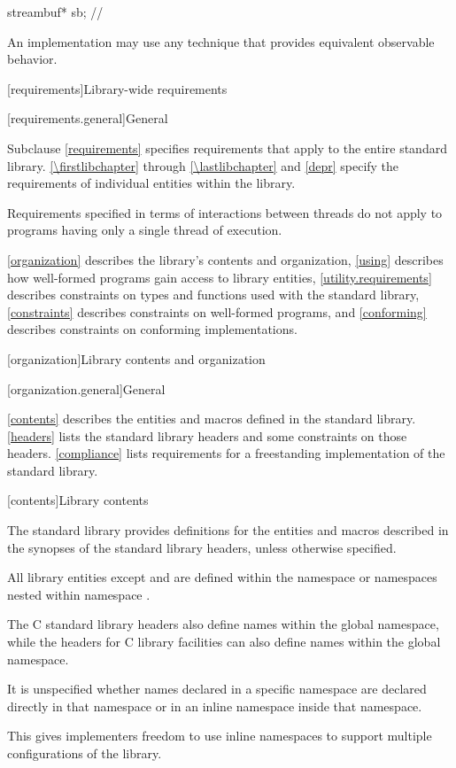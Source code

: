 \begin{codeblock}
streambuf* sb;      // \expos
\end{codeblock}

\pnum
An implementation may use any technique that provides equivalent observable behavior.

[requirements]{Library-wide requirements}

[requirements.general]{General}

\pnum
Subclause \ref{requirements} specifies requirements that apply to the entire \Cpp{} standard library.
\ref{\firstlibchapter} through \ref{\lastlibchapter} and \ref{depr}
specify the requirements of individual entities within the library.

\pnum
Requirements specified in terms of interactions between threads do not apply to
programs having only a single thread of execution.

\pnum
\ref{organization} describes the library's contents and
organization, \ref{using} describes how well-formed \Cpp{} programs gain access to library
entities,
\ref{utility.requirements} describes constraints on types and functions used with
the \Cpp{} standard library,
\ref{constraints} describes constraints on well-formed \Cpp{} programs, and
\ref{conforming} describes constraints on conforming implementations.

[organization]{Library contents and organization}

[organization.general]{General}

\pnum
\ref{contents} describes the entities and macros defined in the \Cpp{} standard library.
\ref{headers} lists the standard library headers and some constraints on those headers.
\ref{compliance} lists requirements for a freestanding implementation of the \Cpp{}
standard library.

[contents]{Library contents}

\pnum
The \Cpp{} standard library provides definitions
for the entities and macros described in the synopses
of the \Cpp{} standard library headers,
unless otherwise specified.

\pnum
All library entities except
and
are defined within the namespace
or namespaces nested within namespace
.
\begin{footnote}
The C standard library headers also define
names within the global namespace, while the \Cpp{} headers for C library
facilities can also define names within the global namespace.
\end{footnote}
It is unspecified whether names declared in a specific namespace are declared
directly in that namespace or in an inline namespace inside that
namespace.
\begin{footnote}
This gives implementers freedom to use inline namespaces to
support multiple configurations of the library.
\end{footnote}

